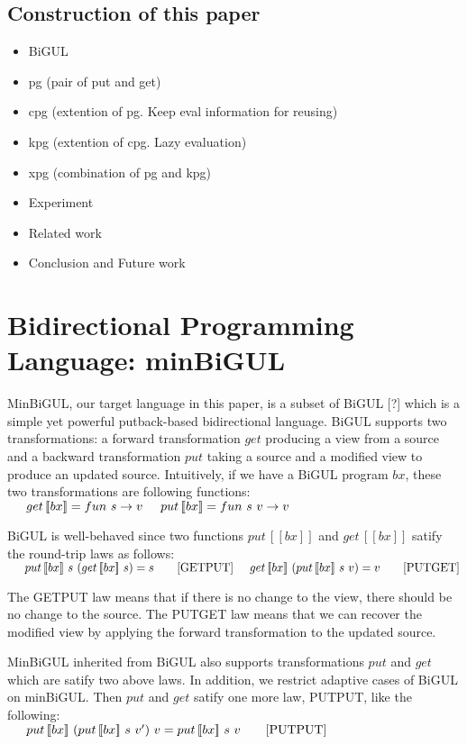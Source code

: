 \documentclass[runningheads]{llncs}
\newcommand{\tab}{\hspace*{5mm}}
\newcommand{\putbx}[3]{put \, [\![#1]\!] \ #2 \ #3}
\newcommand{\putbxinline}[1]{put \, [\![#1]\!]}
\newcommand{\getbx}[2]{get \, [\![#1]\!] \ #2}
\newcommand{\getbxinline}[1]{get \, [\![#1]\!]}
\begin{document}
\subsection{Construction of this paper}

\begin{itemize}
\item BiGUL 
\item pg (pair of put and get)
\item cpg (extention of pg. Keep eval information for reusing)
\item kpg (extention of cpg. Lazy evaluation)
\item xpg (combination of pg and kpg)
\item Experiment
\item Related work
\item Conclusion and Future work
\end{itemize}

\section{Bidirectional Programming Language: minBiGUL}

MinBiGUL, our target language in this paper, is a subset of BiGUL [?] which is a simple yet powerful putback-based bidirectional language. BiGUL supports two transformations: a forward transformation $get$ producing a view from a source and a backward transformation $put$ taking a source and a modified view to produce an updated source. Intuitively, if we have a BiGUL program $bx$, these two transformations are following functions:\\
    $\tab \getbxinline{bx} = fun \ s \to v \\
    \tab \putbxinline{bx} = fun \ s \ v \to v$

BiGUL is well-behaved since two functions $\putbxinline{bx}$ and $\getbxinline{bx}$ satify the round-trip laws as follows:\\
    $\tab \putbx{bx}{s}{(\getbx{bx}{s})} = s \qquad [\text{GETPUT}]\\
    \tab \getbx{bx}{(\putbx{bx}{s}{v})} = v \qquad [\text{PUTGET}]$

The GETPUT law means that if there is no change to the view, there should be no change to the source. The PUTGET law means that we can recover the modified view by applying the forward transformation to the updated source.

MinBiGUL inherited from BiGUL also supports transformations $put$ and $get$ which are satify two above laws. In addition, we restrict adaptive cases of BiGUL on minBiGUL. Then $put$ and $get$ satify one more law, PUTPUT, like the following:\\
    $\tab \putbx{bx}{(\putbx{bx}{s}{v'})}{v} = \putbx{bx}{s}{v} \qquad [\text{PUTPUT}]$
\end{document}

